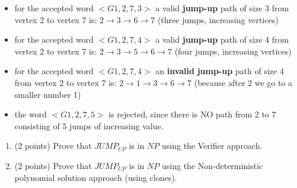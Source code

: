 \documentclass[12pt]{article}
\newenvironment{question}[2][Question]{\begin{trivlist}
\item[\hskip \labelsep {\bfseries #1}\hskip \labelsep {\bfseries #2.}]}{\end{trivlist}}
\begin{document}
\begin{question}{5}
\begin{itemize}
    \item for the accepted word $<G1,2,7,3>$ a valid \textbf{jump-up} path of size 3 from vertex 2 to vertex 7 is: $2 \rightarrow 3 \rightarrow 6 \rightarrow 7$ (three jumps, increasing vertices)
    \item for the accepted word $<G1,2,7,4>$ a valid \textbf{jump-up} path of size 4 from vertex 2 to vertex 7 is: $2 \rightarrow 3 \rightarrow 5 \rightarrow 6 \rightarrow 7$ (four jumps, increasing vertices)
    \item for the accepted word $<G1,2,7,4>$ an \textbf{invalid} \textbf{jump-up} path of size 4 from vertex 2 to vertex 7 is: $2 \rightarrow 1 \rightarrow 3 \rightarrow 6 \rightarrow 7$ (because after 2 we go to a smaller number 1)
    \item the word $<G1,2,7,5>$ is rejected, since there is NO path from 2 to 7 consisting of 5 jumps of increasing value.
\end{itemize}


\begin{enumerate}
    \item (2 points) Prove that $JUMP_{UP}$ is in $NP$ using the Verifier approach.

    \item (2 points) Prove that $JUMP_{UP}$ is in $NP$ using the Non-deterministic polynomial solution approach (using clones).


\end{enumerate}

\end{question}

\newpage
\end{document}
